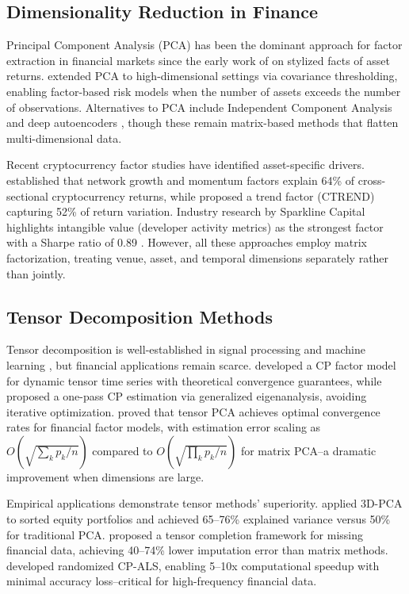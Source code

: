 \documentclass{article}
\begin{document}
\subsection{Dimensionality Reduction in Finance}

Principal Component Analysis (PCA) has been the dominant approach for factor extraction in financial markets since the early work of \citet{Cont2001Empirical} on stylized facts of asset returns. \citet{Fan2013Large} extended PCA to high-dimensional settings via covariance thresholding, enabling factor-based risk models when the number of assets exceeds the number of observations. Alternatives to PCA include Independent Component Analysis \citep{Back1997First} and deep autoencoders \citep{Heaton2017Deep}, though these remain matrix-based methods that flatten multi-dimensional data.

Recent cryptocurrency factor studies have identified asset-specific drivers. \citet{Liu2021Risks} established that network growth and momentum factors explain 64\% of cross-sectional cryptocurrency returns, while \citet{Fieberg2023CTREND} proposed a trend factor (CTREND) capturing 52\% of return variation. Industry research by Sparkline Capital highlights intangible value (developer activity metrics) as the strongest factor with a Sharpe ratio of 0.89 \citep{Sparkline2025IntangibleValue}. However, all these approaches employ matrix factorization, treating venue, asset, and temporal dimensions separately rather than jointly.

\subsection{Tensor Decomposition Methods}

Tensor decomposition is well-established in signal processing and machine learning \citep{Kolda2009Tensor,Cichocki2015Tensor}, but financial applications remain scarce. \citet{Han2022CP} developed a CP factor model for dynamic tensor time series with theoretical convergence guarantees, while \citet{Chang2023Modelling} proposed a one-pass CP estimation via generalized eigenanalysis, avoiding iterative optimization. \citet{Babii2023Tensor} proved that tensor PCA achieves optimal convergence rates for financial factor models, with estimation error scaling as $O(\sqrt{\sum_k p_k / n})$ compared to $O(\sqrt{\prod_k p_k / n})$ for matrix PCA--a dramatic improvement when dimensions are large.

Empirical applications demonstrate tensor methods' superiority. \citet{Lettau2024ThreeD} applied 3D-PCA to sorted equity portfolios and achieved 65--76\% explained variance versus 50\% for traditional PCA. \citet{Mo2025ACT} proposed a tensor completion framework for missing financial data, achieving 40--74\% lower imputation error than matrix methods. \citet{Battaglino2018Practical} developed randomized CP-ALS, enabling 5--10x computational speedup with minimal accuracy loss--critical for high-frequency financial data.
\end{document}
